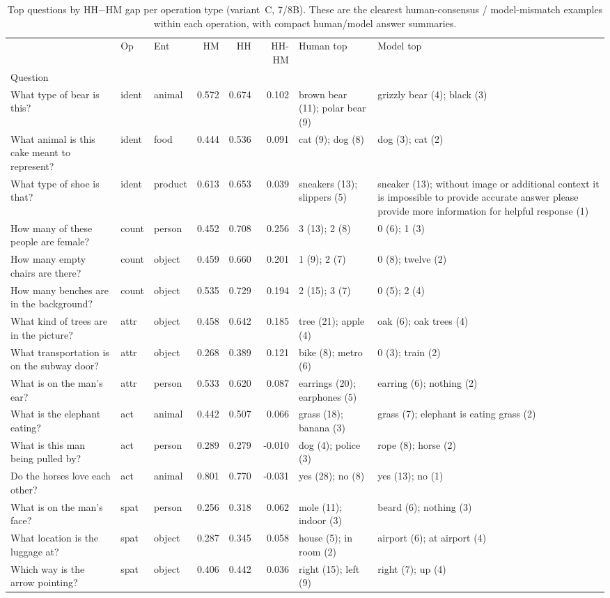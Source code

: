 \begin{table}[t]
\centering
\caption{Top questions by HH$-$HM gap per operation type (variant~C, 7/8B). These are the clearest human-consensus / model-mismatch examples within each operation, with compact human/model answer summaries.}
\label{tab:qual_gap_op_answers}
\small
\setlength{\tabcolsep}{4pt}
\begin{tabular}{p{4.0cm}llrrrp{2.6cm}p{2.6cm}}
\toprule
 & Op & Ent & HM & HH & HH-HM & Human top & Model top \\
Question &  &  &  &  &  &  &  \\
\midrule
What type of bear is this? & ident & animal & 0.572 & 0.674 & 0.102 & brown bear (11); polar bear (9) & grizzly bear (4); black (3) \\
What animal is this cake meant to represent? & ident & food & 0.444 & 0.536 & 0.091 & cat (9); dog (8) & dog (3); cat (2) \\
What type of shoe is that? & ident & product & 0.613 & 0.653 & 0.039 & sneakers (13); slippers (5) & sneaker (13); without image or additional context it is impossible to provide accurate answer please provide more information for helpful response (1) \\
How many of these people are female? & count & person & 0.452 & 0.708 & 0.256 & 3 (13); 2 (8) & 0 (6); 1 (3) \\
How many empty chairs are there? & count & object & 0.459 & 0.660 & 0.201 & 1 (9); 2 (7) & 0 (8); twelve (2) \\
How many benches are in the background? & count & object & 0.535 & 0.729 & 0.194 & 2 (15); 3 (7) & 0 (5); 2 (4) \\
What kind of trees are in the picture? & attr & object & 0.458 & 0.642 & 0.185 & tree (21); apple (4) & oak (6); oak trees (4) \\
What transportation is on the subway door? & attr & object & 0.268 & 0.389 & 0.121 & bike (8); metro (6) & 0 (3); train (2) \\
What is on the man's ear? & attr & person & 0.533 & 0.620 & 0.087 & earrings (20); earphones (5) & earring (6); nothing (2) \\
What is the elephant eating? & act & animal & 0.442 & 0.507 & 0.066 & grass (18); banana (3) & grass (7); elephant is eating grass (2) \\
What is this man being pulled by? & act & person & 0.289 & 0.279 & -0.010 & dog (4); police (3) & rope (8); horse (2) \\
Do the horses love each other? & act & animal & 0.801 & 0.770 & -0.031 & yes (28); no (8) & yes (13); no (1) \\
What is on the man's face? & spat & person & 0.256 & 0.318 & 0.062 & mole (11); indoor (3) & beard (6); nothing (3) \\
What location is the luggage at? & spat & object & 0.287 & 0.345 & 0.058 & house (5); in room (2) & airport (6); at airport (4) \\
Which way is the arrow pointing? & spat & object & 0.406 & 0.442 & 0.036 & right (15); left (9) & right (7); up (4) \\
\bottomrule
\end{tabular}
\end{table}
